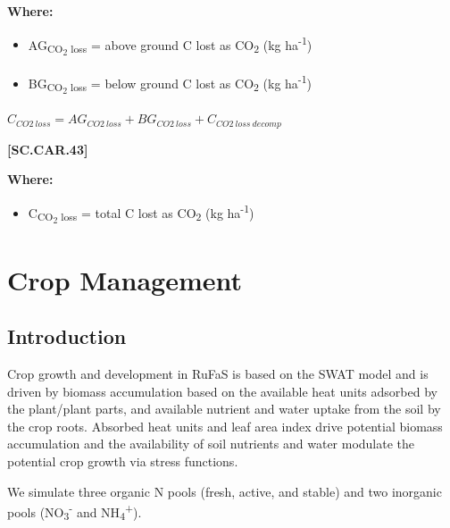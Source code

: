         \textbf{Where:}
            
        \begin{itemize}
            \item AG\textsubscript{CO\textsubscript{2} loss} = above ground C lost as CO\textsubscript{2} (kg ha\textsuperscript{-1})
            \item BG\textsubscript{CO\textsubscript{2} loss} = below ground C lost as CO\textsubscript{2} (kg ha\textsuperscript{-1})
        \end{itemize}
        \vspace{0.5cm}

    \begin{center}
\(C_{CO2\ loss}=AG_{CO2\ loss}+BG_{CO2\ loss}+C_{CO2\ loss\ decomp}\)

    \end{center}
        \vspace{0.5cm} 
    
            {\raggedleft \textbf{[SC.CAR.43]}\par}
            \vspace{0.5cm}

        \textbf{Where:}
            
        \begin{itemize}
            \item C\textsubscript{CO\textsubscript{2} loss} = total C lost as CO\textsubscript{2} (kg ha\textsuperscript{-1})
        \end{itemize}
        \vspace{0.5cm}


\section{Crop Management}
\subsection{Introduction}
Crop growth and development in RuFaS is based on the SWAT model and is driven by biomass accumulation based on the available heat units adsorbed by the plant/plant parts, and available nutrient and water uptake from the soil by the crop roots. Absorbed heat units and leaf area index drive potential biomass accumulation and the availability of soil nutrients and water modulate the potential crop growth via stress functions. 
\vspace{0.2cm}

We simulate three organic N pools (fresh, active, and stable) and two inorganic pools (NO\textsubscript{3}\textsuperscript{-} and NH\textsubscript{4}\textsuperscript{+}).
\vspace{0.2cm}

